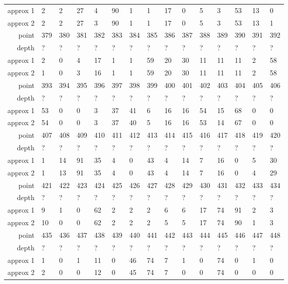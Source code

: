 \begin{center}
\begin{supertabular}{|r|l l l l l l l l l l l l l l|}
approx 1 & 2 & 2 & 27 & 4 & 90 & 1 & 1 & 17 & 0 & 5 & 3 & 53 & 13 & 0 \\
approx 2 & 2 & 2 & 27 & 3 & 90 & 1 & 1 & 17 & 0 & 5 & 3 & 53 & 13 & 1 \\
\hline
point & 379 & 380 & 381 & 382 & 383 & 384 & 385 & 386 & 387 & 388 & 389 & 390 & 391 & 392 \\
\hline
depth & ? & ? & ? & ? & ? & ? & ? & ? & ? & ? & ? & ? & ? & ? \\
approx 1 & 2 & 0 & 4 & 17 & 1 & 1 & 59 & 20 & 30 & 11 & 11 & 11 & 2 & 58 \\
approx 2 & 1 & 0 & 3 & 16 & 1 & 1 & 59 & 20 & 30 & 11 & 11 & 11 & 2 & 58 \\
\hline
point & 393 & 394 & 395 & 396 & 397 & 398 & 399 & 400 & 401 & 402 & 403 & 404 & 405 & 406 \\
\hline
depth & ? & ? & ? & ? & ? & ? & ? & ? & ? & ? & ? & ? & ? & ? \\
approx 1 & 53 & 0 & 0 & 3 & 37 & 41 & 6 & 16 & 16 & 54 & 15 & 68 & 0 & 0 \\
approx 2 & 54 & 0 & 0 & 3 & 37 & 40 & 5 & 16 & 16 & 53 & 14 & 67 & 0 & 0 \\
\hline
point & 407 & 408 & 409 & 410 & 411 & 412 & 413 & 414 & 415 & 416 & 417 & 418 & 419 & 420 \\
\hline
depth & ? & ? & ? & ? & ? & ? & ? & ? & ? & ? & ? & ? & ? & ? \\
approx 1 & 1 & 14 & 91 & 35 & 4 & 0 & 43 & 4 & 14 & 7 & 16 & 0 & 5 & 30 \\
approx 2 & 1 & 13 & 91 & 35 & 4 & 0 & 43 & 4 & 14 & 7 & 16 & 0 & 4 & 29 \\
\hline
point & 421 & 422 & 423 & 424 & 425 & 426 & 427 & 428 & 429 & 430 & 431 & 432 & 433 & 434 \\
\hline
depth & ? & ? & ? & ? & ? & ? & ? & ? & ? & ? & ? & ? & ? & ? \\
approx 1 & 9 & 1 & 0 & 62 & 2 & 2 & 2 & 6 & 6 & 17 & 74 & 91 & 2 & 3 \\
approx 2 & 10 & 0 & 0 & 62 & 2 & 2 & 2 & 5 & 5 & 17 & 74 & 90 & 1 & 3 \\
\hline
point & 435 & 436 & 437 & 438 & 439 & 440 & 441 & 442 & 443 & 444 & 445 & 446 & 447 & 448 \\
\hline
depth & ? & ? & ? & ? & ? & ? & ? & ? & ? & ? & ? & ? & ? & ? \\
approx 1 & 1 & 0 & 1 & 11 & 0 & 46 & 74 & 7 & 1 & 0 & 74 & 0 & 1 & 0 \\
approx 2 & 2 & 0 & 0 & 12 & 0 & 45 & 74 & 7 & 0 & 0 & 74 & 0 & 0 & 0 \\

\end{supertabular}
\end{center}
